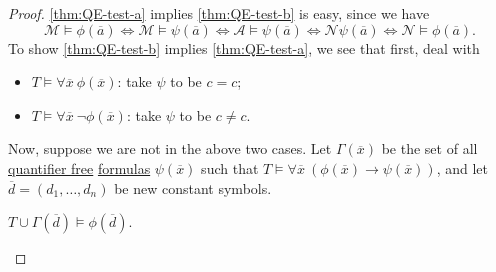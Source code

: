 \begin{proof}
	\autoref{thm:QE-test-a} implies \autoref{thm:QE-test-b} is easy, since we have
	\[
		\mathcal{M} \models \phi (\overline{a} )
		\iff \mathcal{M} \models \psi (\overline{a} )
		\iff \mathcal{A} \models \psi (\overline{a} )
		\iff \mathcal{N} \psi (\overline{a} )
		\iff \mathcal{N} \models \phi (\overline{a} ).
	\]
	To show \autoref{thm:QE-test-b} implies \autoref{thm:QE-test-a}, we see that first, deal with
	\begin{itemize}
		\item \(T \models \forall \overline{x} \ \phi (\overline{x} )\): take \(\psi \) to be \(c = c\);
		\item \(T \models \forall \overline{x} \ \lnot \phi (\overline{x} )\): take \(\psi \) to be \(c \neq c\).
	\end{itemize}
	Now, suppose we are not in the above two cases. Let \(\Gamma (\overline{x} )\) be the set of all \hyperref[not:quantifier-free]{quantifier free} \hyperref[def:formula]{formulas} \(\psi (\overline{x} )\) such that \(T \models \forall \overline{x} \ (\phi (\overline{x} ) \to \psi (\overline{x} ))\), and let \(\overline{d} = (d_1, \ldots , d_n)\) be new constant symbols.
	\begin{claim}
		\(T \cup \Gamma (\overline{d} ) \models \phi (\overline{d} )\).
	\end{claim}
	\begin{explanation}

\end{explanation}
\end{proof}

